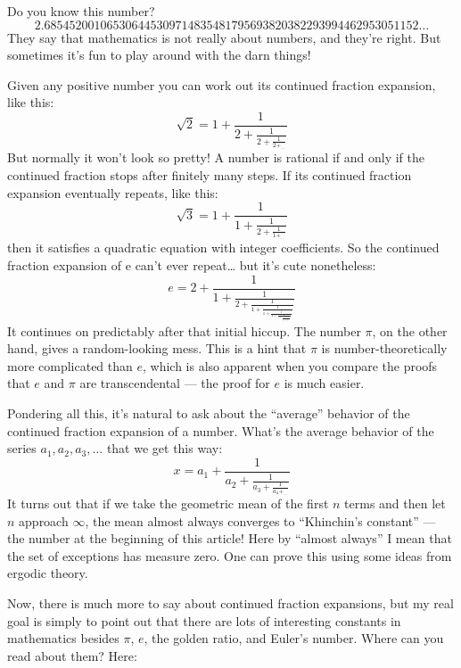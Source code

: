 \documentclass{article}
\def\tightlist{}
\renewcommand{\texttt}[1]{%
  \begingroup
  \ttfamily
  \begingroup\lccode`~=`/\lowercase{\endgroup\def~}{/\discretionary{}{}{}}%
  \begingroup\lccode`~=`[\lowercase{\endgroup\def~}{[\discretionary{}{}{}}%
  \begingroup\lccode`~=`.\lowercase{\endgroup\def~}{.\discretionary{}{}{}}%
  \catcode`/=\active\catcode`[=\active\catcode`.=\active
  \scantokens{#1\noexpand}%
  \endgroup
}
\begin{document}
Do you know this number?
\[2.685452001065306445309714835481795693820382293994462953051152\ldots\]
They say that mathematics is not really about numbers, and they're
right. But sometimes it's fun to play around with the darn things!

Given any positive number you can work out its continued fraction
expansion, like this:
\[\sqrt{2} = 1+\frac{1}{2+\frac{1}{2+\frac{1}{2+_{\ldots}}}}\] But
normally it won't look so pretty! A number is rational if and only if
the continued fraction stops after finitely many steps. If its continued
fraction expansion eventually repeats, like this:
\[\sqrt{3} = 1+\frac{1}{1+\frac{1}{2+\frac{1}{1+_{\ldots}}}}\] then it
satisfies a quadratic equation with integer coefficients. So the
continued fraction expansion of e can't ever repeat\ldots{} but it's
cute nonetheless:
\[e = 2+\frac{1}{1+\frac{1}{2+\frac{1}{1+\frac{1}{1+\frac{1}{4+\frac{1}{1+\frac{1}{1+\frac{1}{6+_{\ldots}}}}}}}}}\]
It continues on predictably after that initial hiccup. The number
\(\pi\), on the other hand, gives a random-looking mess. This is a hint
that \(\pi\) is number-theoretically more complicated than \(e\), which
is also apparent when you compare the proofs that \(e\) and \(\pi\) are
transcendental --- the proof for \(e\) is much easier.

Pondering all this, it's natural to ask about the ``average'' behavior
of the continued fraction expansion of a number. What's the average
behavior of the series \(a_1, a_2, a_3, \ldots\) that we get this way:
\[x=a_1+\frac{1}{a_2+\frac{1}{a_3+\frac{1}{a_4+_{\ldots}}}}\] It turns
out that if we take the geometric mean of the first \(n\) terms and then
let \(n\) approach \(\infty\), the mean almost always converges to
``Khinchin's constant'' --- the number at the beginning of this article!
Here by ``almost always'' I mean that the set of exceptions has measure
zero. One can prove this using some ideas from ergodic theory.

Now, there is much more to say about continued fraction expansions, but
my real goal is simply to point out that there are lots of interesting
constants in mathematics besides \(\pi\), \(e\), the golden ratio, and
Euler's number. Where can you read about them? Here:

\end{document}

